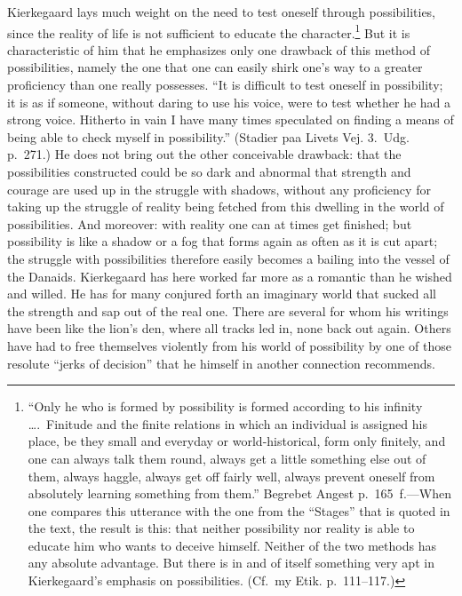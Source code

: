 \documentclass[12pt,a4paper]{book}
\newcommand{\opage}[1]{\marginnote{\footnotesize\textit{[#1]}}}
\begin{document}
Kierkegaard lays much weight on the need to test oneself through
possibilities, since the reality of life is not sufficient to educate the
character.\footnote{``Only he who is formed by possibility is formed
according to his infinity \dots.\ Finitude and the finite relations in
which an individual is assigned his place, be they small and everyday or
world-historical, form only finitely, and one can always talk them round,
always get a little something else out of them, always haggle, always get
off fairly well, always prevent oneself from absolutely learning
something from them.'' Begrebet Angest p.~165~f.---When one compares this
utterance with the one from the ``Stages'' that is quoted in the text,
the result is this: that neither possibility nor reality is able to
educate him who wants to deceive himself. Neither of the two methods has
any absolute advantage. But there is in and of itself something very apt
in Kierkegaard's emphasis on possibilities. (Cf.\ my Etik.
p.~111--117.)} But it is characteristic of him that he emphasizes only
one drawback of this method of possibilities, namely the one
\opage{51}that one can easily shirk one's way to a greater proficiency than
one really possesses. ``It is difficult to test oneself in possibility;
it is as if someone, without daring to use his voice, were to test
whether he had a strong voice. Hitherto in vain I have many times
speculated on finding a means of being able to check myself in
possibility.'' (Stadier paa Livets Vej. 3.~Udg. p.~271.) He does not
bring out the other conceivable drawback: that the possibilities
constructed could be so dark and abnormal that strength and courage are
used up in the struggle with shadows, without any proficiency for taking
up the struggle of reality being fetched from this dwelling in the world
of possibilities. And moreover: with reality one can at times get
finished; but possibility is like a shadow or a fog that forms again as
often as it is cut apart; the struggle with possibilities therefore
easily becomes a bailing into the vessel of the Danaids. Kierkegaard has
here worked far more as a romantic than he wished and willed. He has for
many conjured forth an imaginary world that sucked all the strength and
sap out of the real one. There are several for whom his writings have
been like the lion's den, where all tracks led in, none back out again.
Others have had to free themselves violently from his world of
possibility by one of those resolute ``jerks of decision'' that he
himself in another connection recommends.
\end{document}
